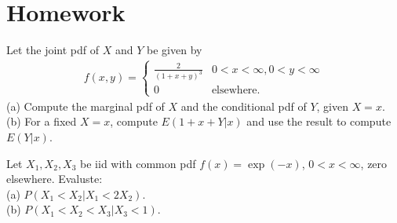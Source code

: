 \section{Homework}

\begin{exercise}{}{}
    Let the joint pdf of $X$ and $Y$ be given by
    \begin{align*}
        f(x,y) = \left\{\begin{matrix}
            \frac{2}{(1+x+y)^3} & 0<x<\infty, 0<y<\infty\\
            0 & \text{elsewhere}.
           \end{matrix}\right.
    \end{align*}
    (a) Compute the marginal pdf of $X$ and the conditional pdf of $Y$, given $X=x$.\\
    (b) For a fixed $X=x$, compute $E(1+x+Y|x)$ and use the result to compute $E(Y|x)$.
\end{exercise}

\begin{exercise}{}{}
    Let $X_1,X_2,X_3$ be iid with common pdf $f(x)=\exp(-x)$, $0<x<\infty$,
    zero elsewhere. Evaluste:\\
    (a) $P(X_1<X_2|X_1<2X_2)$.\\
    (b) $P(X_1<X_2<X_3|X_3<1)$.
\end{exercise}

